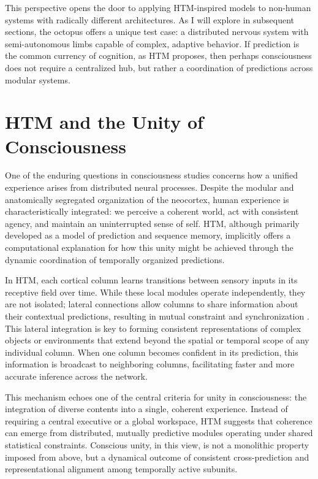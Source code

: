 \documentclass{article}
\begin{document}
This perspective opens the door to applying HTM-inspired models to non-human systems with radically different architectures. As I will explore in subsequent sections, the octopus offers a unique test case: a distributed nervous system with semi-autonomous limbs capable of complex, adaptive behavior. If prediction is the common currency of cognition, as HTM proposes, then perhaps consciousness does not require a centralized hub, but rather a coordination of predictions across modular systems.

\section{HTM and the Unity of Consciousness}

One of the enduring questions in consciousness studies concerns how a unified experience arises from distributed neural processes. Despite the modular and anatomically segregated organization of the neocortex, human experience is characteristically integrated: we perceive a coherent world, act with consistent agency, and maintain an uninterrupted sense of self. HTM, although primarily developed as a model of prediction and sequence memory, implicitly offers a computational explanation for how this unity might be achieved through the dynamic coordination of temporally organized predictions.

In HTM, each cortical column learns transitions between sensory inputs in its receptive field over time. While these local modules operate independently, they are not isolated; lateral connections allow columns to share information about their contextual predictions, resulting in mutual constraint and synchronization \parencite{hawkins2017theory}. This lateral integration is key to forming consistent representations of complex objects or environments that extend beyond the spatial or temporal scope of any individual column. When one column becomes confident in its prediction, this information is broadcast to neighboring columns, facilitating faster and more accurate inference across the network.

This mechanism echoes one of the central criteria for unity in consciousness: the integration of diverse contents into a single, coherent experience. Instead of requiring a central executive or a global workspace, HTM suggests that coherence can emerge from distributed, mutually predictive modules operating under shared statistical constraints. Conscious unity, in this view, is not a monolithic property imposed from above, but a dynamical outcome of consistent cross-prediction and representational alignment among temporally active subunits.
\end{document}
